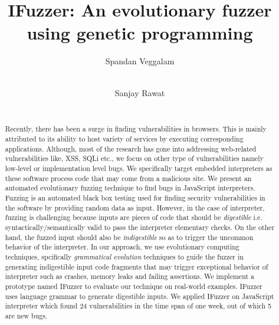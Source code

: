 \documentclass{acm_proc_article-sp}
\begin{document}

\title{IFuzzer: An evolutionary fuzzer using genetic programming}
\author{
\alignauthor
Spandan Veggalam\\
       \\
\and
\alignauthor
Sanjay Rawat\\
       \\
}
\maketitle

\begin{abstract}
Recently, there has been a surge in finding vulnerabilities in browsers. This is mainly attributed to its ability to host variety of services by executing corresponding applications. Although, most of the research has gone into addressing web-related vulnerabilities like, XSS, SQLi etc., we focus on other type of vulnerabilities namely low-level or implementation level bugs. We specifically target embedded interpreters as these software process code that may come from a malicious site. We present an automated evolutionary fuzzing technique to find bugs in JavaScript interpreters. Fuzzing is an automated black box testing used for finding security vulnerabilities in the software by providing random data as input. However, in the case of interpreter, fuzzing is challenging because inputs are pieces of code that should be \emph{digestible} i.e. syntactically/semantically valid to pass the interpreter elementary checks. On the other hand, the fuzzed input should also be \emph{indigestible} so as to trigger the uncommon behavior of the interpreter. In our approach, we use evolutionary computing techniques, spcifically \emph{grammatical evolution} techniques to guide the fuzzer in generating indigestible input code fragments that may trigger exceptional behavior of interpreter such as crashes, memory leaks and failing assertions. We implement a prototype named IFuzzer to evaluate our technique on real-world examples. IFuzzer uses language grammar to generate digestible inputs. We applied IFuzzer on JavaScript interpreter which found 24 vulnerabilities in the time span of one week, out of which 5 are new bugs.
\end{abstract}
\end{document}
